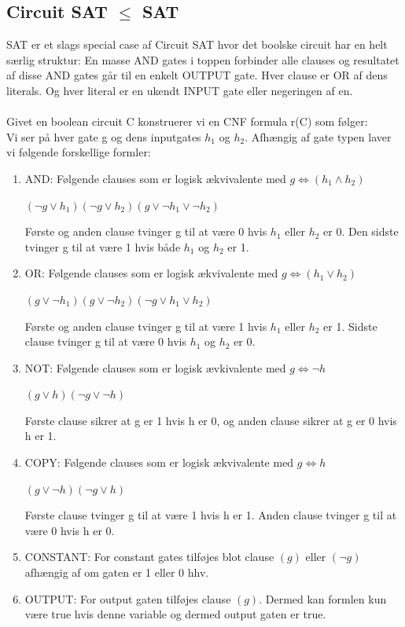 \documentclass{article}
\begin{document}
\subsection{Circuit SAT $\le$ SAT}
SAT er et slags special case af Circuit SAT hvor det boolske circuit har en helt særlig struktur: En masse AND gates i toppen forbinder alle clauses og resultatet af disse AND gates går til en enkelt OUTPUT gate. Hver clause er OR af dens literals. Og hver literal er en ukendt INPUT gate eller negeringen af en.\\\\
Givet en boolean circuit C konstruerer vi en CNF formula r(C) som følger:\\
Vi ser på hver gate g og dens inputgates $h_1$ og $h_2$. Afhængig af gate typen laver vi følgende forskellige formler:
\begin{enumerate}
	\item AND: Følgende clauses som er logisk ækvivalente med $g \iff (h_1 \land h_2)$
	\begin{center}
		$(\lnot g \lor h_1)(\lnot g \lor h_2)(g \lor \lnot h_1 \lor \lnot h_2)$
	\end{center}
	 Første og anden clause tvinger g til at være 0 hvis $h_1$ eller $h_2$ er 0. Den sidste tvinger g til at være 1 hvis både $h_1$ og $h_2$ er 1.
	\item OR: Følgende clauses som er logisk ækvivalente med $g \iff (h_1 \lor h_2)$
	\begin{center}
		$(g \lor \lnot h_1)(g \lor \lnot h_2)(\lnot g \lor  h_1 \lor h_2)$
	\end{center}
	Første og anden clause tvinger g til at være 1 hvis $h_1$ eller $h_2$ er 1. Sidste clause tvinger g til at være 0 hvis $h_1$ og $h_2$ er 0.
	\item NOT: Følgende clauses som er logisk ævkivalente med $g \iff \lnot h$
	\begin{center}
		$(g \lor h)(\lnot g \lor \lnot h)$
	\end{center}
	Første clause sikrer at g er 1 hvis h er 0, og anden clause sikrer at g er 0 hvis h er 1.
	\item COPY: Følgende clauses som er logisk ækvivalente med $g \iff h$
	\begin{center}
		$(g \lor  \lnot h)(\lnot g \lor h)$
	\end{center}
	Første clause tvinger g til at være 1 hvis h er 1. Anden clause tvinger g til at være 0 hvis h er 0.
	\item CONSTANT: For constant gates tilføjes blot clause $(g)$ eller $(\lnot g)$ afhængig af om gaten er 1 eller 0 hhv. 
	\item OUTPUT: For output gaten tilføjes clause $(g)$. Dermed kan formlen kun være true hvis denne variable og dermed output gaten er true.
\end{enumerate}
\end{document}
